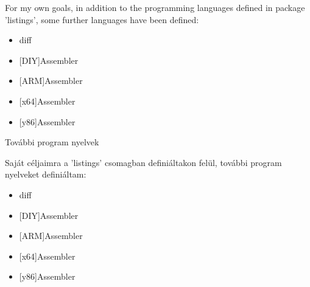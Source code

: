 
{ For my own goals, in addition to the programming languages
defined in package 'listings', some further languages
have been defined:
\begin{itemize}
\item diff
\item {[DIY]Assembler}
\item {[ARM]Assembler}
\item {[x64]Assembler}
\item {[y86]Assembler}
\end{itemize}
}
{További program nyelvek}
{
Saját céljaimra a 'listings' csomagban definiáltakon felül,
további program nyelveket definiáltam:
\begin{itemize}
\item diff
\item {[DIY]Assembler}
\item {[ARM]Assembler}
\item {[x64]Assembler}
\item {[y86]Assembler}
\end{itemize}
}